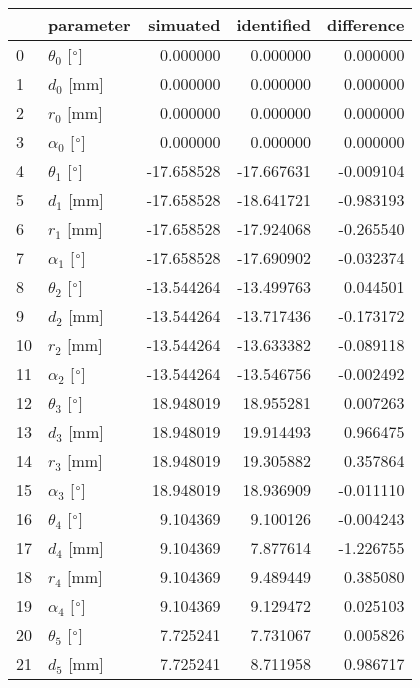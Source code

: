 \documentclass{standalone}%
\begin{document}
%
\normalsize%
\begin{tabular}{llrrr}
\toprule
{} &                 parameter &   simuated & identified & difference \\
\midrule
0  &  $\theta_{0}$ [$\degree$] &   0.000000 &   0.000000 &   0.000000 \\
1  &              $d_{0}$ [mm] &   0.000000 &   0.000000 &   0.000000 \\
2  &              $r_{0}$ [mm] &   0.000000 &   0.000000 &   0.000000 \\
3  &  $\alpha_{0}$ [$\degree$] &   0.000000 &   0.000000 &   0.000000 \\
4  &  $\theta_{1}$ [$\degree$] & -17.658528 & -17.667631 &  -0.009104 \\
5  &              $d_{1}$ [mm] & -17.658528 & -18.641721 &  -0.983193 \\
6  &              $r_{1}$ [mm] & -17.658528 & -17.924068 &  -0.265540 \\
7  &  $\alpha_{1}$ [$\degree$] & -17.658528 & -17.690902 &  -0.032374 \\
8  &  $\theta_{2}$ [$\degree$] & -13.544264 & -13.499763 &   0.044501 \\
9  &              $d_{2}$ [mm] & -13.544264 & -13.717436 &  -0.173172 \\
10 &              $r_{2}$ [mm] & -13.544264 & -13.633382 &  -0.089118 \\
11 &  $\alpha_{2}$ [$\degree$] & -13.544264 & -13.546756 &  -0.002492 \\
12 &  $\theta_{3}$ [$\degree$] &  18.948019 &  18.955281 &   0.007263 \\
13 &              $d_{3}$ [mm] &  18.948019 &  19.914493 &   0.966475 \\
14 &              $r_{3}$ [mm] &  18.948019 &  19.305882 &   0.357864 \\
15 &  $\alpha_{3}$ [$\degree$] &  18.948019 &  18.936909 &  -0.011110 \\
16 &  $\theta_{4}$ [$\degree$] &   9.104369 &   9.100126 &  -0.004243 \\
17 &              $d_{4}$ [mm] &   9.104369 &   7.877614 &  -1.226755 \\
18 &              $r_{4}$ [mm] &   9.104369 &   9.489449 &   0.385080 \\
19 &  $\alpha_{4}$ [$\degree$] &   9.104369 &   9.129472 &   0.025103 \\
20 &  $\theta_{5}$ [$\degree$] &   7.725241 &   7.731067 &   0.005826 \\
21 &              $d_{5}$ [mm] &   7.725241 &   8.711958 &   0.986717 \\

\end{tabular}
\end{document}
